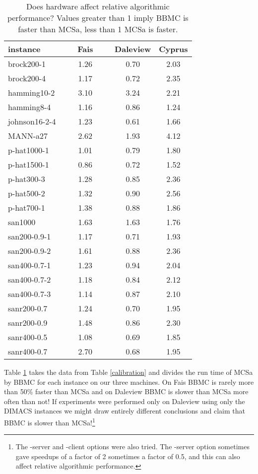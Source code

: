 \documentclass[runningheads]{llncs}
\begin{document}
\begin{table}
\begin{center}
\begin{scriptsize}
\begin{tabular}{|l|c|c|c|}  \hline
instance & ~~~Fais~~~ & Daleview & Cyprus \\ \hline
brock200-1 & 1.26  & 0.70  & 2.03  \\ 
brock200-4 & 1.17  & 0.72  & 2.35  \\ 
hamming10-2 & 3.10  & 3.24  & 2.21  \\ 
hamming8-4 & 1.16  & 0.86  & 1.24  \\ 
johnson16-2-4 & 1.23  & 0.61  & 1.66  \\ 
MANN-a27 & 2.62  & 1.93  & 4.12  \\ 
p-hat1000-1 & 1.01  & 0.79  & 1.80  \\ 
p-hat1500-1 & 0.86  & 0.72  & 1.52  \\ 
p-hat300-3 & 1.28  & 0.85  & 2.36  \\ 
p-hat500-2 & 1.32  & 0.90  & 2.56  \\ 
p-hat700-1 & 1.38  & 0.88  & 1.86  \\ 
san1000 & 1.63  & 1.63  & 1.76  \\ 
san200-0.9-1 & 1.17  & 0.71  & 1.93  \\ 
san200-0.9-2 & 1.61  & 0.88  & 2.36  \\ 
san400-0.7-1 & 1.23  & 0.94  & 2.04  \\ 
san400-0.7-2 & 1.18  & 0.84  & 2.12  \\ 
san400-0.7-3 & 1.14  & 0.87  & 2.10  \\ 
sanr200-0.7 & 1.24  & 0.70  & 1.95  \\ 
sanr200-0.9 & 1.48  & 0.86 & 2.30 \\
sanr400-0.5 & 1.08  & 0.69 & 1.85  \\ 
sanr400-0.7 & 2.70 & 0.68 & 1.95 \\ \hline
\end{tabular}
\end{scriptsize}
\end{center}
\caption{Does hardware affect relative algorithmic performance? 
Values greater than 1 imply BBMC is faster than MCSa, less than 1 MCSa is faster.}
\label{calibrationAlg}
\end{table}

Table \ref{calibrationAlg} takes the data from Table \ref{calibration} and divides the
run time of MCSa by BBMC for each instance on our three machines. 
On Fais BBMC is rarely more than 50\% faster than MCSa and on Daleview BBMC is slower than MCSa more often than not! 
If experiments were performed
only on Daleview using only the DIMACS instances we might draw entirely different conclusions and claim that BBMC is slower 
than MCSa!\footnote{The -server and -client options were also tried. The -server option sometimes
gave speedups of a factor of 2 sometimes a factor of 0.5, and this can also affect relative algorithmic performance.}
\end{document}
